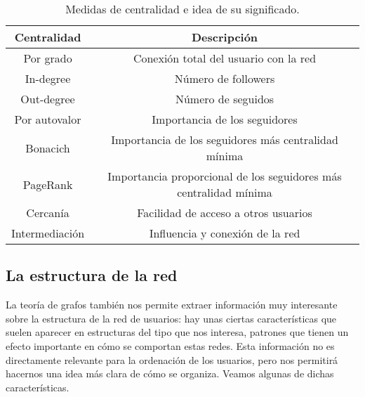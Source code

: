 \begin{center}
\begin{table}
\begin{tabular}{c|c}
{\bf Centralidad} &{\bf Descripción}\\ \hline\hline
Por grado & Conexión total del usuario con la red\\ \hline
In-degree & Número de followers\\ \hline
Out-degree & Número de seguidos\\ \hline
Por autovalor & Importancia de los seguidores\\ \hline
Bonacich & Importancia de los seguidores más centralidad mínima\\ \hline
PageRank & Importancia proporcional de los seguidores más centralidad mínima\\ \hline
Cercanía & Facilidad de acceso a otros usuarios\\ \hline
Intermediación & Influencia y conexión de la red\\ \hline
\end{tabular}
\medskip
\caption{Medidas de centralidad e idea de su significado.}
\label{tab:medidas_cent_significado}
\end{table}
\end{center}

\subsection{La estructura de la red}
La teoría de grafos también nos permite extraer información
muy interesante sobre la estructura de la red de usuarios:
hay unas ciertas características que suelen aparecer en estructuras del
tipo que nos interesa, patrones que tienen un efecto importante en cómo 
se comportan estas redes.  Esta información no es directamente 
relevante para la ordenación de los usuarios, pero nos permitirá hacernos 
una idea más clara de cómo se organiza. Veamos algunas de dichas características.

